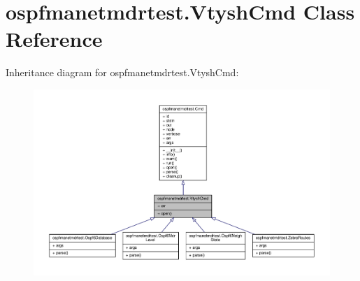 \hypertarget{classospfmanetmdrtest_1_1_vtysh_cmd}{\section{ospfmanetmdrtest.\+Vtysh\+Cmd Class Reference}
\label{classospfmanetmdrtest_1_1_vtysh_cmd}
}


Inheritance diagram for ospfmanetmdrtest.\+Vtysh\+Cmd\+:
\nopagebreak
\begin{figure}[H]
\begin{center}
\leavevmode
\includegraphics[width=350pt]{classospfmanetmdrtest_1_1_vtysh_cmd__inherit__graph}
\end{center}
\end{figure}


